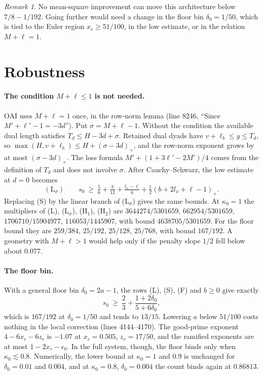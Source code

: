 \documentclass[11pt]{article}
\theoremstyle{remark}\newtheorem*{remark}{Remark}
\begin{document}
\begin{remark}
No mean-square improvement can move this architecture below $7/8-1/192$. Going further would need a
change in the floor bin $\delta_0=1/50$, which is tied to the Euler region $x_r\ge51/100$, in the
low estimate, or in the relation $M+\ell=1$.
\end{remark}

\section{Robustness}
\paragraph{The condition $M+\ell\le1$ is not needed.} OAI uses $M+\ell=1$ once, in the row-norm
lemma (line 8246, ``Since $M'+\ell'-1=-3d$''). Put $\sigma=M+\ell-1$. Without the condition the
available dual length satisfies $T_d\le H-3d+\sigma$. Retained dual dyads have
$v+\ell_b\le y\le T_d$, so $\max(H,v+\ell_b)\le H+(\sigma-3d)_+$, and the row-norm exponent grows by at
most $(\sigma-3d)_+$. The loss formula $M'+(1+3\ell'-2M')/4$ comes from the definition of $T_d$ and does
not involve $\sigma$. After Cauchy--Schwarz, the low estimate at $d=0$ becomes
\[ (\mathrm L_\sigma)\qquad s_0\ \ge\ \tfrac56+\tfrac{b}{12}+\tfrac{l_x-\ell}{6}+\tfrac12(b+2l_x+\ell-1)_+ . \]
Replacing (S) by the linear branch of (L$_\sigma$) gives the same bounds. At $\kappa_0=1$ the
multipliers of (L), (L$_\sigma$), (H$_1$), (H$_2$) are $3644274/5301659$, $662954/5301659$,
$1706710/15904977$, $116053/1445907$, with bound $4638705/5301659$. For the floor bound they are
$259/384$, $25/192$, $25/128$, $25/768$, with bound $167/192$. A geometry with $M+\ell>1$ would help only if the penalty
slope $1/2$ fell below about $0.077$.

\paragraph{The floor bin.} With a general floor bin $\delta_0=2a-1$, the rows (L), (S), (F) and
$b\ge0$ give exactly
\[ s_0\ \ge\ \frac23+\frac{1+2\delta_0}{5+6\delta_0}, \]
which is $167/192$ at $\delta_0=1/50$ and tends to $13/15$. Lowering $a$ below $51/100$ costs nothing
in the local correction (lines 4144--4170). The good-prime exponent $4-6x_r-6z_r$ is $-1.07$ at
$x_r=0.505$, $z_r=17/50$, and the ramified exponents are at most $1-2x_r-\epsilon_0$. In the full
system, though, the floor binds only when $\kappa_0\lesssim0.8$. Numerically, the lower bound at
$\kappa_0=1$ and $0.9$ is unchanged for $\delta_0=0.01$ and $0.004$, and at $\kappa_0=0.8$,
$\delta_0=0.004$ the count binds again at $0.86813$.
\end{document}
